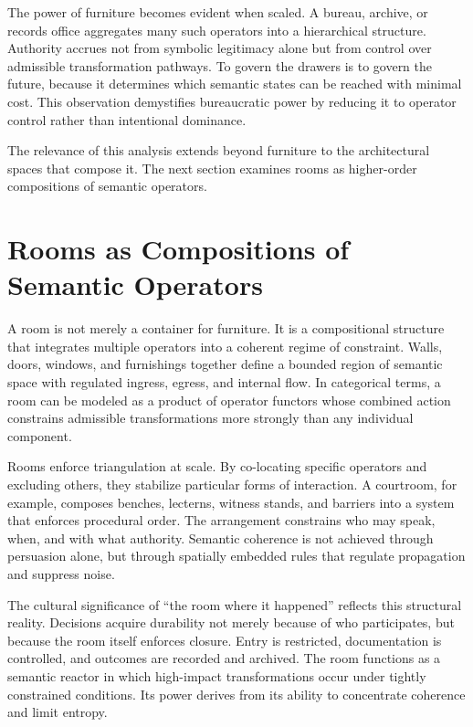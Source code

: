 \documentclass[11pt,oneside]{article}
\begin{document}
The power of furniture becomes evident when scaled. A bureau, archive, or records office aggregates many such operators into a hierarchical structure. Authority accrues not from symbolic legitimacy alone but from control over admissible transformation pathways. To govern the drawers is to govern the future, because it determines which semantic states can be reached with minimal cost. This observation demystifies bureaucratic power by reducing it to operator control rather than intentional dominance.

The relevance of this analysis extends beyond furniture to the architectural spaces that compose it. The next section examines rooms as higher-order compositions of semantic operators.

\section{Rooms as Compositions of Semantic Operators} 

A room is not merely a container for furniture. It is a compositional structure that integrates multiple operators into a coherent regime of constraint. Walls, doors, windows, and furnishings together define a bounded region of semantic space with regulated ingress, egress, and internal flow. In categorical terms, a room can be modeled as a product of operator functors whose combined action constrains admissible transformations more strongly than any individual component.

Rooms enforce triangulation at scale. By co-locating specific operators and excluding others, they stabilize particular forms of interaction. A courtroom, for example, composes benches, lecterns, witness stands, and barriers into a system that enforces procedural order. The arrangement constrains who may speak, when, and with what authority. Semantic coherence is not achieved through persuasion alone, but through spatially embedded rules that regulate propagation and suppress noise.

The cultural significance of “the room where it happened” reflects this structural reality. Decisions acquire durability not merely because of who participates, but because the room itself enforces closure. Entry is restricted, documentation is controlled, and outcomes are recorded and archived. The room functions as a semantic reactor in which high-impact transformations occur under tightly constrained conditions. Its power derives from its ability to concentrate coherence and limit entropy.
\end{document}
